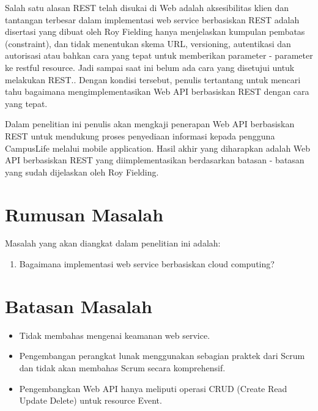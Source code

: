 \documentclass[a4paper, 12pt]{report}
\begin{document}
Salah satu alasan REST telah disukai di Web adalah aksesibilitas klien dan tantangan terbesar dalam implementasi web service berbasiskan REST adalah disertasi yang dibuat oleh Roy Fielding hanya menjelaskan kumpulan pembatas (constraint), dan tidak menentukan skema URL, versioning, autentikasi dan autorisasi atau bahkan cara yang tepat untuk memberikan parameter - parameter ke restful resource. Jadi sampai saat ini belum ada cara yang disetujui untuk melakukan REST.\cite{programmableweb-apis}. Dengan kondisi tersebut, penulis tertantang untuk mencari tahu bagaimana mengimplementasikan Web API berbasiskan REST dengan cara yang tepat.

Dalam penelitian ini penulis akan mengkaji penerapan Web API berbasiskan REST untuk mendukung proses penyediaan informasi kepada pengguna CampusLife melalui mobile application. Hasil akhir yang diharapkan adalah Web API berbasiskan REST yang diimplementasikan berdasarkan batasan - batasan yang sudah dijelaskan oleh Roy Fielding.

\section*{Rumusan Masalah}
\begin{flushleft}
Masalah yang akan diangkat dalam penelitian ini adalah:
\begin{enumerate}
  \item Bagaimana implementasi web service berbasiskan cloud computing?
\end{enumerate}
\end{flushleft}

\section*{Batasan Masalah}
\begin{flushleft}
\begin{itemize}
  \item Tidak membahas mengenai keamanan web service.
  \item Pengembangan perangkat lunak menggunakan sebagian praktek dari Scrum dan tidak akan membahas Scrum secara komprehensif.
  \item Pengembangkan Web API hanya meliputi operasi CRUD (Create Read Update Delete) untuk resource Event.
\end{itemize}
\end{flushleft}
\end{document}
